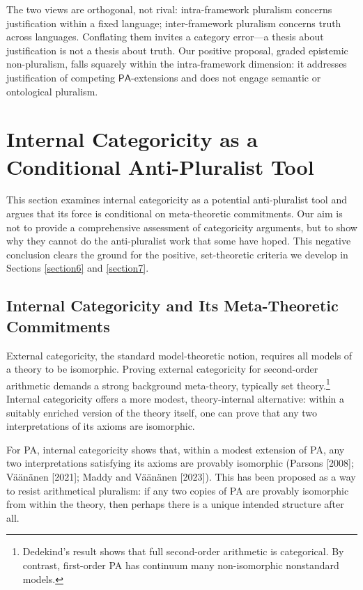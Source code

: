 \documentclass[a4paper,12pt]{amsart}
\theoremstyle{definition}
\numberwithin{equation}{section}
\begin{document}
The two views are orthogonal, not rival: intra-framework pluralism concerns justification within a fixed language; inter-framework pluralism concerns truth across languages. Conflating them invites a category error—a thesis about justification is not a thesis about truth. Our positive proposal, graded epistemic non-pluralism, falls squarely within the intra-framework dimension: it addresses justification of competing $\mathsf{PA}$-extensions and does not engage semantic or ontological pluralism.
 
\section{Internal Categoricity as a Conditional Anti-Pluralist Tool}\label{section5}

This section examines internal categoricity as a potential anti-pluralist tool and argues that its force is conditional on meta-theoretic commitments. Our aim is not to provide a comprehensive assessment of categoricity arguments, but to show why they cannot do the anti-pluralist work that some have hoped. This negative conclusion clears the ground for the positive, set-theoretic criteria we develop in Sections \ref{section6} and \ref{section7}.

\subsection{Internal Categoricity and Its Meta-Theoretic Commitments}

External categoricity, the standard model-theoretic notion, requires all models of a theory to be isomorphic. Proving external categoricity for second-order arithmetic demands a strong background meta-theory, typically set theory.\footnote{Dedekind's result shows that full second-order arithmetic is categorical. By contrast, first-order {\sf PA} has continuum many non-isomorphic nonstandard models.} Internal categoricity offers a more modest, theory-internal alternative: within a suitably enriched version of the theory itself, one can prove that any two interpretations of its axioms are isomorphic.
 
For {\sf PA}, internal categoricity shows that, within a modest extension of 
{\sf PA}, any two interpretations satisfying its axioms are provably 
isomorphic (Parsons [2008]; V\"{a}\"{a}n\"{a}nen [2021]; Maddy and V\"{a}\"{a}n\"{a}nen [2023]). This has been proposed as a way to resist arithmetical pluralism: 
if any two copies of {\sf PA} are provably isomorphic from within the theory, 
then perhaps there is a unique intended structure after all.
 
\end{document}

